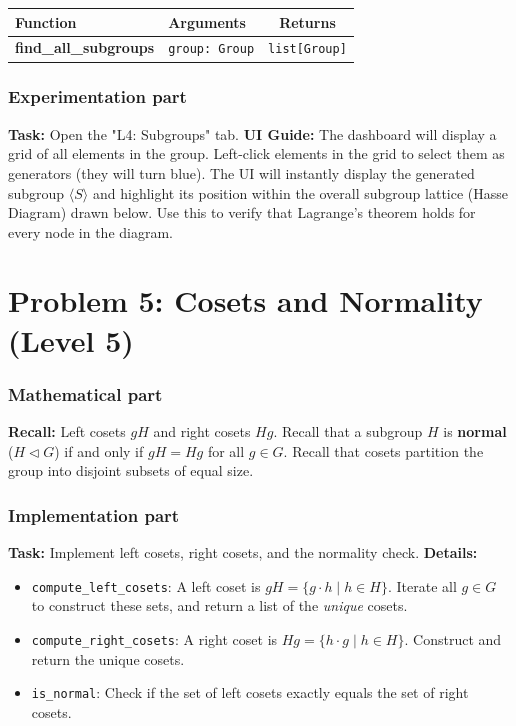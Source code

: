 \documentclass[11pt]{article}
\begin{document}
\begin{center}
\renewcommand{\arraystretch}{1.5}
\begin{tabularx}{\textwidth}{@{} >{\bfseries}l X c @{}}
\toprule
Function & Arguments & Returns \\ \midrule
find\_all\_subgroups & \lstinline|group: Group| & \lstinline|list[Group]| \\
\bottomrule
\end{tabularx}
\end{center}

\subsubsection*{Experimentation part}
\textbf{Task:} Open the "L4: Subgroups" tab.
\textbf{UI Guide:} The dashboard will display a grid of all elements in the group. Left-click elements in the grid to select them as generators (they will turn blue). The UI will instantly display the generated subgroup $\langle S \rangle$ and highlight its position within the overall subgroup lattice (Hasse Diagram) drawn below. Use this to verify that Lagrange's theorem holds for every node in the diagram.


\section*{Problem 5: Cosets and Normality (Level 5)}

\subsubsection*{Mathematical part}
\textbf{Recall:} Left cosets $gH$ and right cosets $Hg$. Recall that a subgroup $H$ is \textbf{normal} ($H \triangleleft G$) if and only if $gH = Hg$ for all $g \in G$. Recall that cosets partition the group into disjoint subsets of equal size.

\subsubsection*{Implementation part}
\textbf{Task:} Implement left cosets, right cosets, and the normality check.
\textbf{Details:} 
\begin{itemize}
    \item \lstinline|compute_left_cosets|: A left coset is $gH = \{g \cdot h \mid h \in H\}$. Iterate all $g \in G$ to construct these sets, and return a list of the \textit{unique} cosets.
    \item \lstinline|compute_right_cosets|: A right coset is $Hg = \{h \cdot g \mid h \in H\}$. Construct and return the unique cosets.
    \item \lstinline|is_normal|: Check if the set of left cosets exactly equals the set of right cosets.
\end{itemize}
\end{document}
